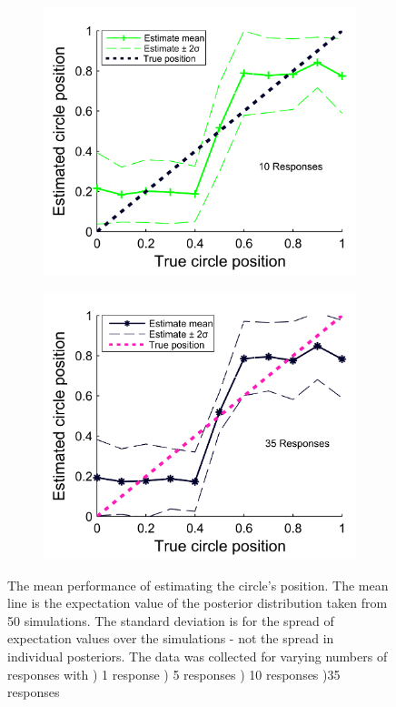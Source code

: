 \begin{figure}
	\begin{subfigure}{7cm}
	\includegraphics[scale=1]{line_fusion_10rep_LR.png}
	\caption{}	
	\label{Figure: fusion_mean_10_LR}
	\end{subfigure}
	\begin{subfigure}{7cm}
	\includegraphics[scale=1]{line_fusion_35rep_LR.png}
	\caption{}	
	\label{Figure: fusion_mean_35_LR}
	\end{subfigure}
	\label{Figure: fusion_mean_LR}
	\caption{The mean performance of estimating the circle's position. The mean line is the expectation value of the posterior distribution taken from 50 simulations. The standard deviation is for the spread of expectation values over the simulations - not the spread in individual posteriors. The data was collected for varying numbers of responses with ) 1 response ) 5 responses ) 10 responses )35 responses}
\end{figure}
